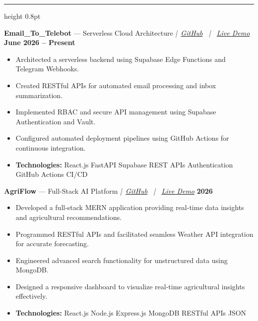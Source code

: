 \documentclass[10pt,a4paper]{article}
\newcommand{\resumesection}[1]{%
  \vspace{5pt}%
  \noindent{\large\textbf{#1}}\par
  \vspace{2pt}%
  \hrule height 0.8pt
  \vspace{4pt}%
}
\begin{document}
\resumesection{KEY PROJECTS}

\noindent\textbf{Email\_To\_Telebot} --- Serverless Cloud Architecture \textit{|\ \href{https://github.com/Rahul-pamula/Email_to_telebot}{GitHub} \ | \ \href{https://rahul-pamula.github.io/Email_to_telebot/}{Live Demo}} \hfill \textbf{June 2026 -- Present}
\begin{itemize}[leftmargin=1.2em, topsep=1pt, itemsep=0pt, parsep=0pt]
    \item Architected a serverless backend using Supabase Edge Functions and Telegram Webhooks.
    \item Created RESTful APIs for automated email processing and inbox summarization.
    \item Implemented RBAC and secure API management using Supabase Authentication and Vault.
    \item Configured automated deployment pipelines using GitHub Actions for continuous integration.
    \item \textbf{Technologies:} React.js \textbullet{} FastAPI \textbullet{} Supabase \textbullet{} REST APIs \textbullet{} Authentication \textbullet{} GitHub Actions \textbullet{} CI/CD
\end{itemize}

\vspace{4pt}

\noindent\textbf{AgriFlow} --- Full-Stack AI Platform \textit{|\ \href{https://github.com/Rahul-pamula/AgriFlow}{GitHub} \ | \ \href{https://agriflow-frontend.onrender.com/}{Live Demo}} \hfill \textbf{2026}
\begin{itemize}[leftmargin=1.2em, topsep=1pt, itemsep=0pt, parsep=0pt]
    \item Developed a full-stack MERN application providing real-time data insights and agricultural recommendations.
    \item Programmed RESTful APIs and facilitated seamless Weather API integration for accurate forecasting.
    \item Engineered advanced search functionality for unstructured data using MongoDB.
    \item Designed a responsive dashboard to visualize real-time agricultural insights effectively.
    \item \textbf{Technologies:} React.js \textbullet{} Node.js \textbullet{} Express.js \textbullet{} MongoDB \textbullet{} RESTful APIs \textbullet{} JSON
\end{itemize}
\end{document}
